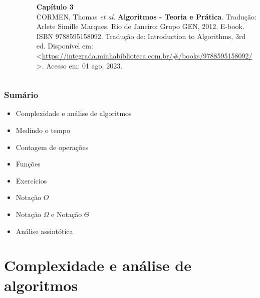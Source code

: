 \documentclass[aspectratio=169]{beamer}
\begin{document}
\begin{frame}
\begin{columns}[T]
\begin{column}{0.15\linewidth}
\vspace{-3mm}
\begin{figure}[h]
	\centering
	\includegraphics[height=0.3\paperheight]{imagens/livro_cormen.jpg}
\end{figure}
\end{column}
\begin{column}{0.85\linewidth}
\vspace{3mm}
\textbf{Capítulo 3}\\
\scriptsize{CORMEN, Thomas \emph{et al}. \textbf{Algoritmos - Teoria e Prática}. Tradução: Arlete Simille Marques. Rio de Janeiro: Grupo GEN, 2012. E-book. ISBN 9788595158092. Tradução de: Introduction to Algorithms, 3rd ed. Disponível em: \textless{}\url{https://integrada.minhabiblioteca.com.br/\#/books/9788595158092/}\textgreater{}. Acesso em: 01 ago. 2023.}
\end{column}
\end{columns}

\end{frame}

\begin{frame}\frametitle{Sumário}
\begin{itemize}
	\item Complexidade e análise de algoritmos
	\item Medindo o tempo
	\item Contagem de operações
	\item Funções
	\item Exercícios
	\item Notação $O$
	\item Notação $\Omega$ e Notação $\Theta$
	\item Análise assintótica
\end{itemize}
\end{frame}

\section{Complexidade e análise de algoritmos}
\end{document}
